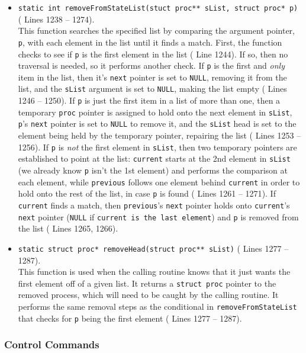 \documentclass[11pt,letterpaper]{report}
\begin{document}
\begin{itemize}
 		\item {\tt static int removeFromStateList(stuct proc** sList, struct proc* p)} ({\color{red} Lines 1238 -- 1274}).\\
 		This function searches the specified list by comparing the argument pointer, {\tt p}, with each element in the list until it finds a match. First, the function checks to see if {\tt p} is the first element in the list ({\color{red} Line 1244}). If so, then no traversal is needed, so it performs another check. If {\tt p} is the first and \emph{only} item in the list, then it's {\tt next} pointer is set to {\tt NULL}, removing it from the list, and the {\tt sList} argument is set to {\tt NULL}, making the list empty ({\color{red} Lines 1246 -- 1250}). If {\tt p} is just the first item in a list of more than one, then a temporary {\tt proc} pointer is assigned to hold onto the next element in {\tt sList}, {\tt p}'s {\tt next} pointer is set to {\tt NULL} to remove it, and the {\tt sList} head is set to the element being held by the temporary pointer, repairing the list ({\color{red} Lines 1253 -- 1256}). If {\tt p} is \emph{not} the first element in {\tt sList}, then two temporary pointers are established to point at the list: {\tt current} starts at the 2nd element in {\tt sList} (we already know {\tt p} isn't the 1st element) and performs the comparison at each element, while {\tt previous} follows one element behind {\tt current} in order to hold onto the rest of the list, in case {\tt p} is found ({\color{red} Lines 1261 -- 1271}). If {\tt current} finds a match, then {\tt previous}'s {\tt next} pointer holds onto {\tt current}'s {\tt next} pointer ({\tt NULL} if {\tt current is the last element}) and {\tt p} is removed from the list ({\color{red} Lines 1265, 1266}).
 		 		
 		\item {\tt static struct proc* removeHead(struct proc** sList)} ({\color{red} Lines 1277 -- 1287}).\\
 		This function is used when the calling routine knows that it just wants the first element off of a given list. It returns a {\tt struct proc} pointer to the removed process, which will need to be caught by the calling routine. It performs the same removal steps as the conditional in {\tt removeFromStateList} that checks for {\tt p} being the first element ({\color{red} Lines 1277 -- 1287}).
 	\end{itemize}
 
 	\subsubsection{Control Commands}
 	
\end{document}
